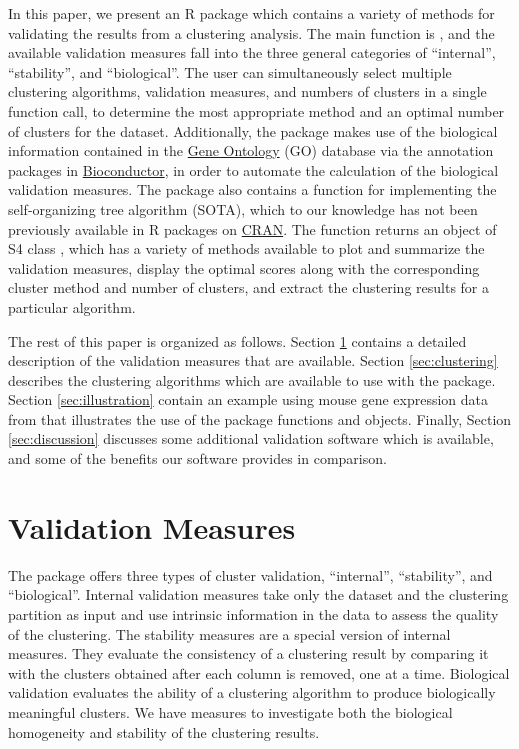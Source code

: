 \documentclass[11pt]{article}
\begin{document}
In this paper, we present an R package  which contains a
variety of methods for validating the results
from a clustering analysis.  
The main function is , and the available validation measures fall into the three general
categories of ``internal'', ``stability'', and ``biological''.  
The user can simultaneously select multiple clustering algorithms,
validation measures, and numbers of clusters in a single function call,
to determine the most appropriate method and
an optimal number of clusters for the dataset.  
Additionally, the  package
makes use of the biological information contained in the 
\href{http://www.geneontology.org/}{Gene Ontology} 
(GO) database via the annotation packages
in \href{http://www.bioconductor.org/}{Bioconductor},
in order to automate the calculation of the biological validation measures.
The package also contains a function for implementing the
self-organizing tree algorithm (SOTA), which to our knowledge has not
been previously available in R packages on \href{http://www.r-project.org}{CRAN}.
The function
returns an object of S4 class , which has 
a variety of methods available to plot and summarize the validation
measures, display the optimal scores along with the corresponding cluster method
and number of clusters, and extract the clustering results for a
particular algorithm.


The rest of this paper is organized as follows.  Section \ref{sec:measures}
contains a detailed description of the validation measures that are
available.  Section \ref{sec:clustering} describes the clustering
algorithms which are available to use with the 
 package.  Section \ref{sec:illustration}
contain an example using mouse gene expression data from
\citet{Bha2007} that illustrates the use of the  package
functions and objects. Finally, Section \ref{sec:discussion} discusses
some additional validation software which is available, and some of
the benefits our software provides in comparison.



\section{Validation Measures}
\label{sec:measures}



The  package offers three types of cluster
validation, ``internal'', ``stability'', and ``biological''.  
Internal validation measures take only the dataset and the clustering
partition as input and use intrinsic information in the data to
assess the quality of the clustering.  
The stability measures are a special version of internal measures.
They evaluate the consistency of a clustering result by comparing it
with the clusters obtained after each column is removed, one at a time.
Biological validation evaluates the ability of a clustering algorithm
to produce biologically meaningful clusters.  We have measures
to investigate both the biological homogeneity and stability of the
clustering results.
\end{document}
